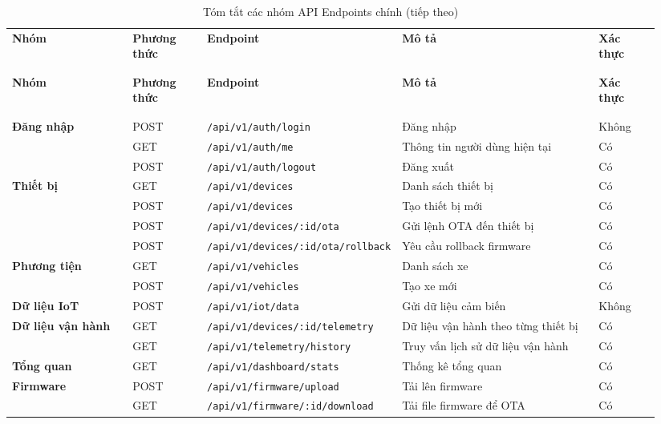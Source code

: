 \documentclass[a4paper]{extarticle}
\newcommand{\thesissettableid}[2]{%
  \renewcommand{\thetable}{#1}%
  \renewcommand{\theHtable}{#2}%
}
\begin{document}
{\thesissettableid{3.22}{tab-ch3-tom-tat-cac-nhom-api-endpoints-chinh}
\def\LTcaptype{table}
\begin{longtable}{|L{0.200\linewidth}|L{0.122\linewidth}|L{0.181\linewidth}|L{0.340\linewidth}|L{0.101\linewidth}|}
\caption{Tóm tắt các nhóm API Endpoints chính}\label{tab:ch3-tom-tat-cac-nhom-api-endpoints-chinh}\\
\hline \textbf{Nhóm} & \textbf{Phương thức} & \textbf{Endpoint} & \textbf{Mô tả} & \textbf{Xác thực} \\
\\\hline
\endfirsthead
\caption[]{Tóm tắt các nhóm API Endpoints chính (tiếp theo)}\\
\hline \textbf{Nhóm} & \textbf{Phương thức} & \textbf{Endpoint} & \textbf{Mô tả} & \textbf{Xác thực} \\
\\\hline
\endhead
\\\hline
\endfoot
\endlastfoot
\textbf{Đăng nhập} & POST & \nolinkurl{/api/v1/auth/login} & Đăng nhập &
Không \\\hline
& GET & \nolinkurl{/api/v1/auth/me} & Thông tin người dùng hiện tại & Có \\\hline
& POST & \nolinkurl{/api/v1/auth/logout} & Đăng xuất & Có \\\hline
\textbf{Thiết bị} & GET & \nolinkurl{/api/v1/devices} & Danh sách thiết bị & Có \\\hline
& POST & \nolinkurl{/api/v1/devices} & Tạo thiết bị mới & Có \\\hline
& POST & \nolinkurl{/api/v1/devices/:id/ota} & Gửi lệnh OTA đến thiết bị & Có \\\hline
& POST & \nolinkurl{/api/v1/devices/:id/ota/rollback} & Yêu cầu rollback firmware &
Có \\\hline
\textbf{Phương tiện} & GET & \nolinkurl{/api/v1/vehicles} & Danh sách xe & Có \\\hline
& POST & \nolinkurl{/api/v1/vehicles} & Tạo xe mới & Có \\\hline
\textbf{Dữ liệu IoT} & POST & \nolinkurl{/api/v1/iot/data} & Gửi dữ liệu cảm biến &
Không \\\hline
\textbf{Dữ liệu vận hành} & GET & \nolinkurl{/api/v1/devices/:id/telemetry} & Dữ liệu
vận hành theo từng thiết bị & Có \\\hline
& GET & \nolinkurl{/api/v1/telemetry/history} & Truy vấn lịch sử dữ liệu vận hành & Có \\\hline
\textbf{Tổng quan} & GET & \nolinkurl{/api/v1/dashboard/stats} & Thống kê tổng quan
& Có \\\hline
\textbf{Firmware} & POST & \nolinkurl{/api/v1/firmware/upload} & Tải lên firmware &
Có \\\hline
& GET & \nolinkurl{/api/v1/firmware/:id/download} & Tải file firmware để OTA & Có \\\hline
\end{longtable}
}
\end{document}
